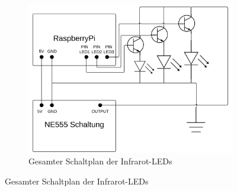 \begin{figure}[h]
	\ContinuedFloat
	\centering
	\begin{subfigure}{\textwidth}
		\includegraphics[height=.4\textheight]{images/schaltung_ne555_led.pdf}
		\caption{Gesamter Schaltplan der Infrarot-LEDs}
		\label{fig:schaltplan_ne555_leds}
	\end{subfigure}
\end{figure}



